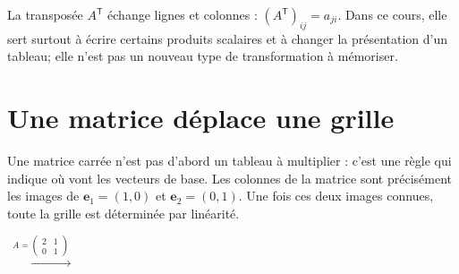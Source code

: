 \documentclass[12pt,a4paper,openany]{book}
\begin{document}
\begin{connectionbox}[title={Notation utile : la transposée}]
La transposée $A^{\mathsf T}$ échange lignes et colonnes : $(A^{\mathsf T})_{ij}=a_{ji}$. Dans ce cours, elle sert surtout à écrire certains produits scalaires et à changer la présentation d'un tableau; elle n'est pas un nouveau type de transformation à mémoriser.
\end{connectionbox}

\section{Une matrice déplace une grille}

\begin{visualbox}
Une matrice carrée n'est pas d'abord un tableau à multiplier : c'est une règle qui indique où vont les vecteurs de base. Les colonnes de la matrice sont précisément les images de $\mathbf e_1=(1,0)$ et $\mathbf e_2=(0,1)$. Une fois ces deux images connues, toute la grille est déterminée par linéarité.
\end{visualbox}

\begin{center}
\quad $\xrightarrow{\ A=\left(\begin{smallmatrix}2&1\\0&1\end{smallmatrix}\right)\ }$ \quad
{}
\end{center}
\end{document}
